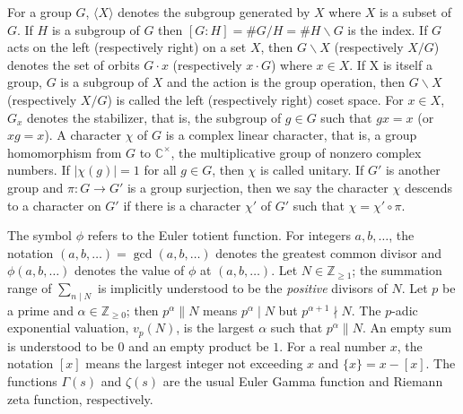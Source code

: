 \documentclass[12pt]{amsart}
\numberwithin{equation}{section}
\theoremstyle{plain}
\theoremstyle{definition}
\theoremstyle{remark}
\newcommand*\abs[1]{\lvert#1\rvert}
\newcommand\numC{\mathbb{C}}
\newcommand\numgeq[2]{\mathbb{#1}_{\geq #2}}
\begin{document}
For a group $G$, $\langle X\rangle$ denotes the subgroup generated by $X$ where $X$ is a subset of $G$. If $H$ is a subgroup of $G$ then $[G\colon H]=\#G/H=\#H\backslash G$ is the index. If $G$ acts on the left (respectively right) on a set $X$, then $G\backslash X$ (respectively $X/G$) denotes the set of orbits $G\cdot x$ (respectively $x\cdot G$) where $x\in X$. If X is itself a group, $G$ is a subgroup of $X$ and the action is the group operation, then $G\backslash X$ (respectively $X/G$) is called the left (respectively right) coset space. For $x\in X$, $G_x$ denotes the stabilizer, that is, the subgroup of $g\in G$ such that $gx=x$ (or $xg=x$). A character $\chi$ of $G$ is a complex linear character, that is, a group homomorphism from $G$ to $\numC^\times$, the multiplicative group of nonzero complex numbers. If $\abs{\chi(g)}=1$ for all $g\in G$, then $\chi$ is called unitary. If $G'$ is another group and $\pi\colon G\rightarrow G'$ is a group surjection, then we say the character $\chi$ descends to a character on $G'$ if there is a character $\chi'$ of $G'$ such that $\chi=\chi'\circ\pi$.

The symbol $\phi$ refers to the Euler totient function. For integers $a, b,\dots$, the notation $(a,b,\dots)=\gcd(a,b,\dots)$ denotes the greatest common divisor and $\phi(a,b,\dots)$ denotes the value of $\phi$ at $(a,b,\dots)$. Let $N\in\numgeq{Z}{1}$; the summation range of $\sum_{n\mid N}$ is implicitly understood to be the \emph{positive} divisors of $N$. Let $p$ be a prime and $\alpha\in\numgeq{Z}{0}$; then $p^\alpha\parallel N$ means $p^\alpha\mid N$ but $p^{\alpha+1}\nmid N$. The $p$-adic exponential valuation, $v_p(N)$, is the largest $\alpha$ such that $p^\alpha\parallel N$. An empty sum is understood to be $0$ and an empty product be $1$. For a real number $x$, the notation $[x]$ means the largest integer not exceeding $x$ and $\{x\}=x-[x]$. The functions $\Gamma(s)$ and $\zeta(s)$ are the usual Euler Gamma function and Riemann zeta function, respectively.
\end{document}
